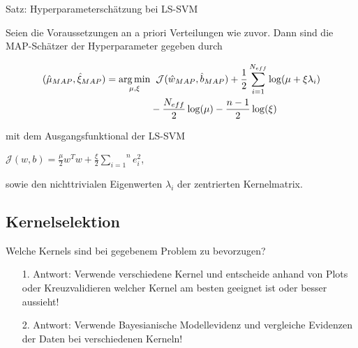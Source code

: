 \documentclass{beamer}
\begin{document}
{\begin{frame}
\begin{block}{Satz: Hyperparameterschätzung bei LS-SVM}

Seien die Voraussetzungen an a priori Verteilungen wie zuvor. Dann sind die MAP-Schätzer der Hyperparameter gegeben durch

\begin{align}
	(\hat{\mu}_{MAP}, \hat{\xi}_{MAP}) = \underset{\mu, \xi}{\arg \min} & \hspace{0.2cm}\mathcal{J}(\hat{w}_{MAP}, \hat{b}_{MAP}) + \frac{1}{2}\sum_{i=1}^{N_{eff}}\log(\mu + \xi \lambda_i) \\
	&- \frac{N_{eff}}{2}\log(\mu) - \frac{n -1 }{2}\log(\xi)
\end{align}



mit dem Ausgangsfunktional der LS-SVM 
\begin{center}
$\mathcal{J}(w,b) = \frac{\mu}{2}w^T w + \frac{\xi}{2}\overset{n}{\underset{i=1}{\sum}} e_i ^2$,
\end{center}
sowie den nichttrivialen Eigenwerten $\lambda_i$ der zentrierten Kernelmatrix.
\end{block}



\end{frame}

\subsection{Kernelselektion}

\begin{frame}
Welche Kernels sind bei gegebenem Problem zu bevorzugen?\\
	\begin{itemize}
		\item[1.]Antwort: \pause Verwende verschiedene Kernel und entscheide anhand von Plots oder Kreuzvalidieren welcher Kernel am besten geeignet ist oder besser aussieht!
		\item[2.]Antwort: \pause Verwende Bayesianische Modellevidenz und vergleiche Evidenzen der Daten bei verschiedenen Kerneln!
	\end{itemize}
\end{frame}

}
\end{document}
